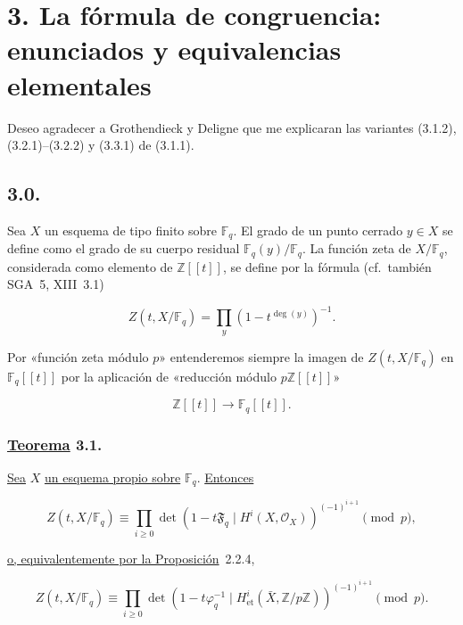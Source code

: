 \pageoriginale

\section*[3. Fórmula de congruencia]{3. La fórmula de congruencia: enunciados y equivalencias elementales}

Deseo agradecer a Grothendieck y Deligne que me explicaran las variantes
{(3.1.2), (3.2.1)--(3.2.2) y (3.3.1)} de (3.1.1).

\subsection*{3.0.}
Sea $X$ un esquema de tipo finito sobre $\mathbb F_q$. El grado de un
punto cerrado $y\in X$ se define como el grado de su cuerpo residual
$\mathbb F_q(y)/\mathbb F_q$. La función zeta de $X/\mathbb F_q$,
considerada como elemento de $\mathbb Z[[t]]$, se define por la fórmula
(cf.~también SGA~5, XIII~3.1)

\begin{equation}\tag{3.0.1}
Z(t,X/\mathbb F_q)=\prod_y(1-t^{\deg(y)})^{-1}.
\end{equation}

Por «función zeta módulo $p$» entenderemos siempre la imagen de
$Z(t,X/\mathbb F_q)$ en $\mathbb F_q[[t]]$ por la aplicación de
«reducción módulo $p\mathbb Z[[t]]$»

\[
\mathbb Z[[t]]\longrightarrow\mathbb F_q[[t]].
\]

\subsubsection*{\underline{Teorema} 3.1.}
\underline{Sea} $X$ \underline{un esquema propio sobre} $\mathbb F_q$. \underline{Entonces}

\begin{equation}\tag{3.1.1}
Z(t,X/\mathbb F_q)
\equiv
\prod_{i\geq0}
\det\!\left(1-t\mathfrak F_q\mid H^i(X,\mathcal O_X)\right)^{(-1)^{i+1}}
\pmod p,
\end{equation}

\underline{o, equivalentemente por la Proposición}~2.2.4,

\begin{equation}\tag{3.1.2}
Z(t,X/\mathbb F_q)
\equiv
\prod_{i\geq0}
\det\!\left(1-t\varphi_q^{-1}\mid
H^i_{\mathrm{et}}(\bar X,\mathbb Z/p\mathbb Z)\right)^{(-1)^{i+1}}
\pmod p.
\end{equation}

